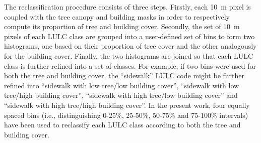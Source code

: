 \documentclass[10pt,letterpaper]{article}
\begin{document}
The reclassification procedure consists of three steps.
Firstly, each 10~m pixel is coupled with the tree canopy and building masks in order to respectively compute its proportion of tree and building cover.
Secondly, the set of 10~m pixels of each LULC class are grouped into a user-defined set of bins to form two histograms, one based on their proportion of tree cover and the other analogously for the building cover.
Finally, the two histograms are joined so that each LULC class is further refined into a set of classes. For example, if two bins were used for both the tree and building cover, the ``sidewalk'' LULC code might be further refined into ``sidewalk with low tree/low building cover'', ``sidewalk with low tree/high building cover'', ``sidewalk with high tree/low building cover'' and ``sidewalk with high tree/high building cover''.
In the present work, four equally spaced bins (i.e., distinguishing 0-25\%, 25-50\%, 50-75\% and 75-100\% intervals) have been used to reclassify each LULC class according to both the tree and building cover.
\end{document}
